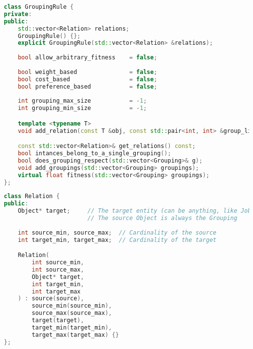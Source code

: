         \begin{lstlisting}[language=C++, caption={\textit{GroupingRule} class that defines valid \textit{Groupings} and its specifications.}, label={script:groupingrule}]
class GroupingRule {
private:
public:
    std::vector<Relation> relations;
    GroupingRule() {};
    explicit GroupingRule(std::vector<Relation> &relations);
        
    bool allow_arbitrary_fitness    = false;
    
    bool weight_based               = false;
    bool cost_based                 = false;
    bool preference_based           = false;
    
    int grouping_max_size           = -1;
    int grouping_min_size           = -1;    

    template <typename T>
    void add_relation(const T &obj, const std::pair<int, int> &group_limits, const std::pair<int, int> &other_limits);

    const std::vector<Relation>& get_relations() const;
    bool intances_belong_to_a_single_grouping(); 
    bool does_grouping_respect(std::vector<Grouping>& g);
    void add_groupings(std::vector<Grouping> groupings);       
    virtual float fitness(std::vector<Grouping> groupings);
};
        \end{lstlisting}


\begin{lstlisting}[language=C++, caption={The \textit{Relation} class defines a list of entity's classes. Each entry in the vector defines the cardinality of the class in the group using four values: the source's Minimum and Maximum Multiplicity and the target's Minimum and Maximum Multiplicity.}, label={script:relation}]
class Relation {
public:
    Object* target;     // The target entity (can be anything, like Job, Worker, etc.)
                        // The source Object is always the Grouping
    
    int source_min, source_max;  // Cardinality of the source
    int target_min, target_max;  // Cardinality of the target

    Relation(
        int source_min, 
        int source_max, 
        Object* target, 
        int target_min, 
        int target_max
    ) : source(source), 
        source_min(source_min), 
        source_max(source_max), 
        target(target), 
        target_min(target_min), 
        target_max(target_max) {}
};
\end{lstlisting}




